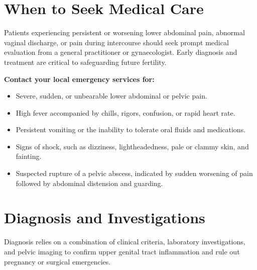 \section*{When to Seek Medical Care}
Patients experiencing persistent or worsening lower abdominal pain, abnormal vaginal discharge, or pain during intercourse should seek prompt medical evaluation from a general practitioner or gynaecologist. Early diagnosis and treatment are critical to safeguarding future fertility.

\textbf{Contact your local emergency services for:}
\begin{itemize}
    \item Severe, sudden, or unbearable lower abdominal or pelvic pain.
    \item High fever accompanied by chills, rigors, confusion, or rapid heart rate.
    \item Persistent vomiting or the inability to tolerate oral fluids and medications.
    \item Signs of shock, such as dizziness, lightheadedness, pale or clammy skin, and fainting.
    \item Suspected rupture of a pelvic abscess, indicated by sudden worsening of pain followed by abdominal distension and guarding.
\end{itemize}

\section*{Diagnosis and Investigations}
Diagnosis relies on a combination of clinical criteria, laboratory investigations, and pelvic imaging to confirm upper genital tract inflammation and rule out pregnancy or surgical emergencies.


